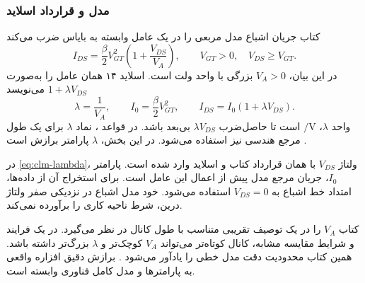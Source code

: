 \subsubsection*{مدل  و قرارداد اسلاید}
کتاب جریان اشباع مدل مربعی را در یک عامل وابسته به بایاس ضرب می‌کند
\cite[رابطه ]{weste}
\begin{equation}
 I_{DS}=\frac{\beta}{2}V_{GT}^2
 \left(1+\frac{V_{DS}}{V_A}\right),
 \qquad V_{GT}>0,\quad V_{DS}\ge V_{GT}.
 \label{eq:clm-early}
\end{equation}
در این بیان، \(V_A>0\) بزرگی  با واحد ولت است.
اسلاید ۱۴ همان عامل را به‌صورت \(1+\lambda V_{DS}\) می‌نویسد
\begin{equation}
 \lambda=\frac{1}{V_A},\qquad
 I_0=\frac{\beta}{2}V_{GT}^2,\qquad
 \boxed{I_{DS}=I_0(1+\lambda V_{DS})}.
 \label{eq:clm-lambda}
\end{equation}
واحد \(\lambda\)، \(\unit{\per\volt}\) است تا حاصل‌ضرب
\(\lambda V_{DS}\) بی‌بعد باشد. در قواعد ، نماد \(\lambda\)
برای یک طول مرجع هندسی نیز استفاده می‌شود. در این بخش، \(\lambda\)
پارامتر برازش  است
\cite[اسلاید ۱۴]{nonideal}.

در \eqref{eq:clm-lambda}، ولتاژ \(V_{DS}\) با همان قرارداد کتاب و اسلاید
وارد شده است. پارامتر \(I_0\)، جریان مرجع مدل پیش از اعمال این عامل است.
برای استخراج آن از داده‌ها، امتداد خط اشباع به \(V_{DS}=0\) استفاده
می‌شود. خود مدل اشباع در نزدیکی صفر ولتاژ درین، شرط ناحیه کاری را
برآورده نمی‌کند.

کتاب \(V_A\) را در یک توصیف تقریبی متناسب با طول کانال در نظر می‌گیرد.
در یک فرایند و شرایط مقایسه مشابه، کانال کوتاه‌تر می‌تواند \(V_A\)
کوچک‌تر و \(\lambda\) بزرگ‌تر داشته باشد. همین کتاب محدودیت دقت مدل
خطی را یادآور می‌شود \cite[صفحه چاپی ۷۸]{weste}. برازش دقیق افزاره
واقعی به پارامترها و مدل کامل فناوری وابسته است.

